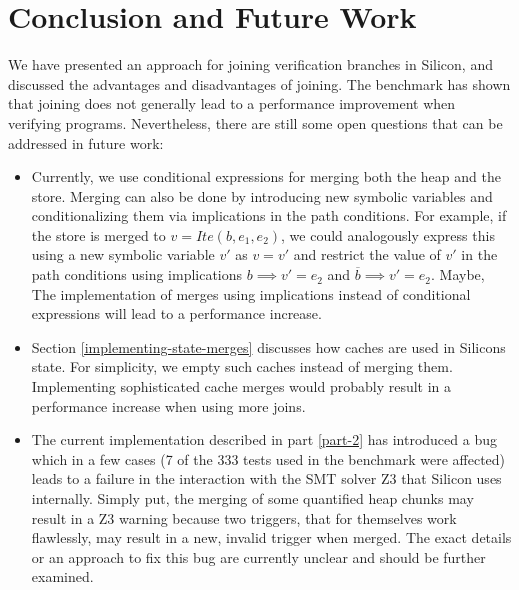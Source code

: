 \documentclass[11pt]{article}
\begin{document}
    \newpage
    \section{Conclusion and Future Work}

    We have presented an approach for joining verification branches
    in Silicon, and discussed the advantages and disadvantages of
    joining. The benchmark has shown that joining does not generally lead
    to a performance improvement when verifying programs.
    Nevertheless, there are still some open questions 
    that can be addressed in future work:

    \begin{itemize}
        \item Currently, we use conditional expressions for merging both
            the heap and the store. Merging can also be done by introducing
            new symbolic variables and conditionalizing them via implications
            in the path conditions. For example, if the store is merged to
            $v = Ite(b, e_1, e_2)$, we could analogously express this using
            a new symbolic variable $v'$ as
            $v = v'$ and restrict the value of $v'$ in the path conditions using implications
            $b \implies v' = e_2$ and $\overline{b} \implies v' = e_2$.
            Maybe, The implementation of merges using
            implications instead of conditional expressions
            will lead to a performance increase.
        \item Section \ref{implementing-state-merges} discusses how caches are
            used in Silicons state. For simplicity, we empty such caches
            instead of merging them. Implementing sophisticated cache merges would
            probably result in a performance increase when using more joins.
        \item The current implementation described in part \ref{part-2}
            has introduced a bug which in a few cases (7 of the 333
            tests used in the benchmark were affected) leads to a failure
            in the interaction with the SMT solver Z3 \cite{z3} that Silicon
            uses internally. Simply put, the merging of some quantified heap
            chunks may result in a Z3 warning because two triggers,
            that for themselves work flawlessly, may result in a new, invalid
            trigger when merged. The exact details or an approach to fix
            this bug are currently unclear and should be further examined.
    \end{itemize}

    \newpage
    \printbibliography

    
\end{document}
